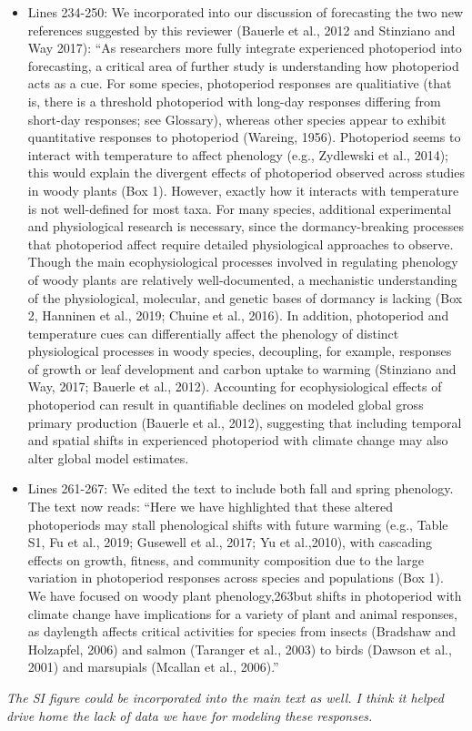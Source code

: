 \documentclass{article}
\begin{document}
\begin{itemize}
\item Lines 234-250: We incorporated into our discussion of forecasting the two new references suggested by this reviewer (Bauerle et al., 2012 and Stinziano and Way 2017): ``As researchers more fully integrate experienced photoperiod into forecasting, a critical area of further study is understanding how photoperiod acts as a cue.  For some species,  photoperiod responses are qualitiative (that  is,  there  is  a  threshold  photoperiod  with  long-day  responses  differing  from  short-day  responses;  see Glossary), whereas other species appear to exhibit quantitative responses to photoperiod (Wareing, 1956). Photoperiod seems to interact with temperature to affect phenology (e.g., Zydlewski et al., 2014); this would explain  the  divergent  effects  of  photoperiod  observed  across  studies  in  woody  plants  (Box  1).   However, exactly how it interacts with temperature is not well-defined for most taxa.  For many species,  additional experimental and physiological research is necessary, since the dormancy-breaking processes that photoperiod affect  require  detailed  physiological  approaches  to  observe.   Though  the  main  ecophysiological  processes involved in regulating phenology of woody plants are relatively well-documented, a mechanistic understanding of the physiological, molecular, and genetic bases of dormancy is lacking (Box 2, Hanninen et al., 2019; Chuine et al., 2016).  In addition, photoperiod and temperature cues can differentially affect the phenology of distinct physiological processes in woody species, decoupling, for example, responses of growth or leaf development and carbon uptake to warming (Stinziano and Way, 2017; Bauerle et al., 2012).  Accounting for ecophysiological effects of photoperiod can result in quantifiable declines on modeled global gross primary production (Bauerle et al., 2012), suggesting that including temporal and spatial shifts in experienced photoperiod with climate change may also alter global model estimates.
\item Lines 261-267: We edited the text to include both fall and spring phenology. The text now reads: ``Here  we  have  highlighted  that  these  altered  photoperiods  may  stall phenological  shifts  with  future  warming  (e.g.,  Table  S1,  Fu  et  al.,  2019;  Gusewell  et  al.,  2017;  Yu  et  al.,2010), with cascading effects on growth,  fitness, and community composition due to the large variation in photoperiod responses across species and populations (Box 1).  We have focused on woody plant phenology,263but shifts in photoperiod with climate change have implications for a variety of plant and animal responses, as daylength affects critical activities for species from insects (Bradshaw and Holzapfel, 2006) and salmon (Taranger et al., 2003) to birds (Dawson et al., 2001) and marsupials (Mcallan et al., 2006).''

\end{itemize}
\par \emph{The SI figure could be incorporated into the main text as well. I think it helped drive home the lack of data we have for modeling these responses.}
\end{document}
